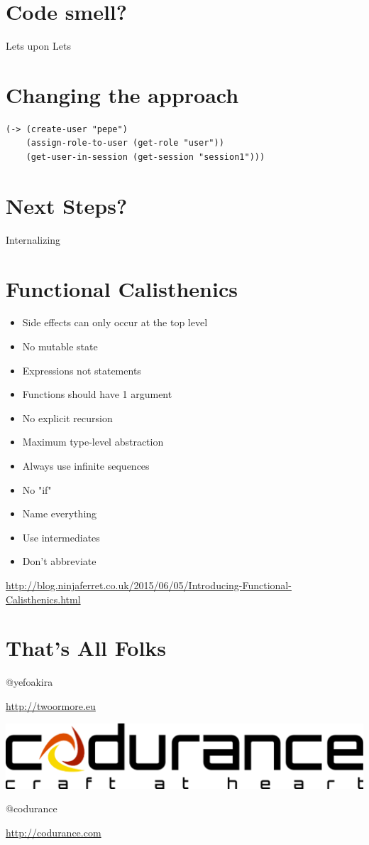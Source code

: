 \documentclass[11pt]{article}
\begin{document}
\section{Code smell?}
\label{sec:org2b128b6}

Lets upon Lets

\section{Changing the approach}
\label{sec:org515d900}
\begin{verbatim}
(-> (create-user "pepe")
    (assign-role-to-user (get-role "user"))
    (get-user-in-session (get-session "session1")))

\end{verbatim}

\section{Next Steps?}
\label{sec:org75d1b0b}

Internalizing

\section{Functional Calisthenics}
\label{sec:orgc40594f}

\begin{itemize}
\item Side effects can only occur at the top level
\item No mutable state
\item Expressions not statements
\item Functions should have 1 argument
\item No explicit recursion
\item Maximum type-level abstraction
\item Always use infinite sequences
\item No "if"
\item Name everything
\item Use intermediates
\item Don't abbreviate
\end{itemize}

\url{http://blog.ninjaferret.co.uk/2015/06/05/Introducing-Functional-Calisthenics.html}

\section{That's All Folks}
\label{sec:org60b3ee1}

@yefoakira


\url{http://twoormore.eu}


\begin{center}
\includegraphics[width=.9\linewidth]{./codurance.png}
\end{center}
@codurance


\url{http://codurance.com}
\end{document}
